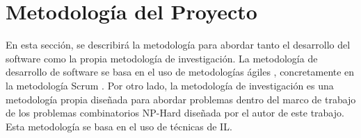 \section{Metodología del Proyecto}
En esta sección, se describirá la metodología para abordar tanto el
desarrollo del software como la propia metodología de investigación. La metodología
de desarrollo de software se basa en el uso de metodologías ágiles \cite{Agile_Microsoft}, concretamente
en la metodología Scrum \cite{Atlassian_Scrum}. Por otro lado, la metodología de investigación es una
metodología propia diseñada para abordar problemas dentro del marco de trabajo de
los problemas combinatorios NP-Hard diseñada por el autor de este trabajo. Esta
metodología se basa en el uso de técnicas de IL.




\pagebreak